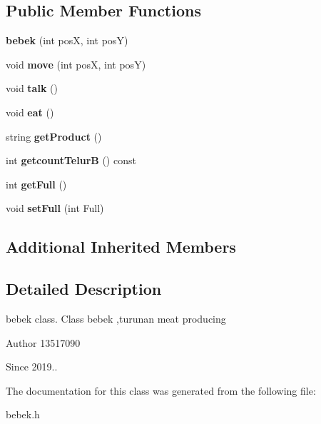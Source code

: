 \subsection*{Public Member Functions}
\begin{DoxyCompactItemize}
\item 
\mbox{\label{classbebek_a2ee5c95e76b1895eb3ebf401f25b989e}} 
{\bfseries bebek} (int posX, int posY)
\item 
\mbox{\label{classbebek_afbb31871852380c811e41b1024c4ef93}} 
void {\bfseries move} (int posX, int posY)
\item 
\mbox{\label{classbebek_a0347ebaf065829f58091d8ef0084ddf7}} 
void {\bfseries talk} ()
\item 
\mbox{\label{classbebek_ad3bafaac86ad4a25a306fdd7e787ad25}} 
void {\bfseries eat} ()
\item 
\mbox{\label{classbebek_a1476735835d8295a99d32058a5a839e4}} 
string {\bfseries get\+Product} ()
\item 
\mbox{\label{classbebek_a819a9382ba77475b6226d66b3accdf17}} 
int {\bfseries getcount\+TelurB} () const
\item 
\mbox{\label{classbebek_ab4a19af30bd41e155db357d58c975bf2}} 
int {\bfseries get\+Full} ()
\item 
\mbox{\label{classbebek_aa68ecf45df676aa449d075a82b3c748c}} 
void {\bfseries set\+Full} (int Full)
\end{DoxyCompactItemize}
\subsection*{Additional Inherited Members}


\subsection{Detailed Description}
bebek class. Class bebek ,turunan meat producing \begin{DoxyAuthor}{Author}
13517090 
\end{DoxyAuthor}
\begin{DoxySince}{Since}
2019.. 
\end{DoxySince}


The documentation for this class was generated from the following file\+:\begin{DoxyCompactItemize}
\item 
bebek.\+h\end{DoxyCompactItemize}
